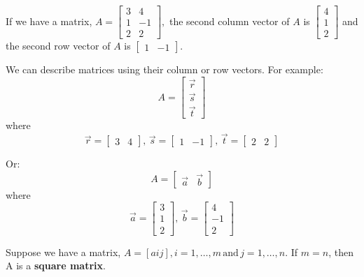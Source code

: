 \documentclass[../main.tex]{subfiles}
\begin{document}
\begin{example}[]
    If we have a matrix, \( A = \begin{bmatrix}
        3 & 4 \\
        1 & -1 \\
        2 & 2 
    \end{bmatrix}, \)
    the second column vector of \( A \) is \( \begin{bmatrix}
        4 \\
        1 \\
        2
    \end{bmatrix} \)
    and the second row vector of \( A \) is \( \begin{bmatrix}
        1 & -1
    \end{bmatrix} \).

    We can describe matrices using their column or row vectors. For example:
    \[ A = \begin{bmatrix}
        \vec{r} \\
        \vec{s} \\
        \vec{t}
    \end{bmatrix} \]
    where \[ \vec{r} = \begin{bmatrix}
        3 & 4
    \end{bmatrix}, \, \vec{s} = \begin{bmatrix}
        1 & -1
    \end{bmatrix}, \, \vec{t} = \begin{bmatrix}
        2 & 2
    \end{bmatrix} \]

    Or: \[ A = \begin{bmatrix}
        \vec{a} & \vec{b}
    \end{bmatrix} \]
    where \[ \vec{a} = \begin{bmatrix}
        3 \\
        1 \\
        2
    \end{bmatrix}, \, \vec{b} = \begin{bmatrix}
        4 \\
        -1 \\
        2
    \end{bmatrix} \]
\end{example}

\begin{definition}
    Suppose we have a matrix, \( A = [aij], i = 1, \dots ,m \, \text{and} \, j = 1, \dots ,n \).
    If \( m=n \), then A is a \textbf{square matrix}.
\end{definition}
\end{document}
